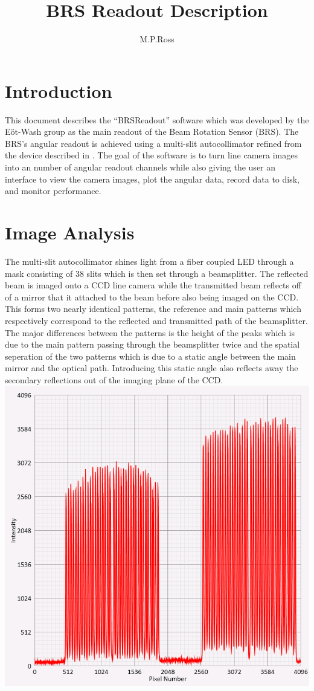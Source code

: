 \documentclass{article}
\title{BRS Readout Description}
\author{M.P.Ross}
\begin{document}
\maketitle
\section{Introduction}
This document describes the ``BRSReadout'' software which was developed by the E{\"o}t-Wash group as the main readout of the Beam Rotation Sensor (BRS). The BRS's angular readout is achieved using a multi-slit autocollimator refined from the device described in \cite{autoCol}. The goal of the software is to turn line camera images into an number of angular readout channels while also giving the user an interface to view the camera images, plot the angular data, record data to disk, and monitor performance.
\section{Image Analysis}
The multi-slit autocollimator shines light from a fiber coupled LED through a mask consisting of 38 slits which is then set through a beamsplitter. The reflected beam is imaged onto a CCD line camera while the transmitted beam reflects off of a mirror that it attached to the beam before also being imaged on the CCD. This forms two nearly identical patterns, the reference and main patterns which respectively correspond to the reflected and transmitted path of the beamsplitter. The major differences between the patterns is the height of the peaks which is due to the main pattern passing through the beamsplitter twice and the spatial seperation of the two patterns which is due to a static angle between the main mirror and the optical path. Introducing this static angle also reflects away the secondary reflections out of the imaging plane of the CCD.\\
\includegraphics[width=\textwidth]{BRSReadoutScreenPatterns.png}
\end{document}
